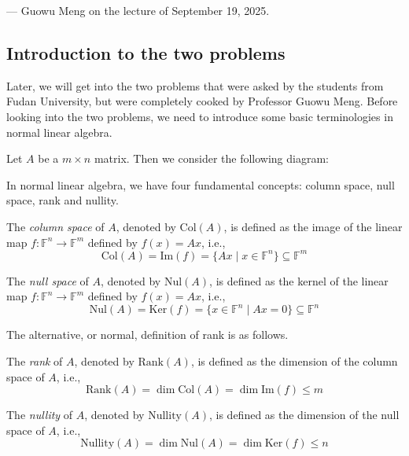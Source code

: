 \documentclass[
	11pt, %
	fleqn, %
	a4paper, %
]{LegrandOrangeBook}
\renewcommand{\ker}[1]{\text{Ker}(#1)} %
\renewcommand{\Im}[1]{\text{Im}(#1)} %
\newcommand{\F}{\mathbb{F}} %
\newcommand{\rank}[1]{\text{Rank}(#1)} %
\newcommand{\nullity}[1]{\text{Nullity}(#1)} %
\newcommand{\nul}[1]{\text{Nul}(#1)} %
\newcommand{\col}[1]{\text{Col}(#1)} %
\begin{document}
\begin{flushright}
    --- Guowu Meng on the lecture of September 19, 2025.
\end{flushright}

\subsection{Introduction to the two problems}

Later, we will get into the two problems that were asked by the students from Fudan University, but were completely cooked by Professor Guowu Meng. Before looking into the two problems, we need to introduce some basic terminologies in normal linear algebra.

Let $A$ be a $m \times n$ matrix. Then we consider the following diagram:
\begin{center}
\end{center}

In normal linear algebra, we have four fundamental concepts: column space, null space, rank and nullity.
\begin{definition}
    The \emph{column space} of $A$, denoted by $\col{A}$, is defined as the image of the linear map $f : \F^n \to \F^m$ defined by $f(x) = Ax$, i.e.,
    \[
        \col{A} = \Im{f} = \{ Ax \mid x \in \F^n \} \subseteq \F^m
    \]
\end{definition}

\newpage

\begin{definition}
    The \emph{null space} of $A$, denoted by $\nul{A}$, is defined as the kernel of the linear map $f : \F^n \to \F^m$ defined by $f(x) = Ax$, i.e.,
    \[
        \nul{A} = \ker{f} = \{ x \in \F^n \mid Ax = 0 \} \subseteq \F^n
    \]
\end{definition}

The alternative, or normal, definition of rank is as follows.
\begin{definition}[Rank]
    The \emph{rank} of $A$, denoted by $\rank{A}$, is defined as the dimension of the column space of $A$, i.e.,
    \[
        \rank{A} = \dim{\col{A}} = \dim{\Im{f}} \leq m
    \]
\end{definition}

\begin{definition}[Nullity]
    The \emph{nullity} of $A$, denoted by $\nullity{A}$, is defined as the dimension of the null space of $A$, i.e.,
    \[
        \nullity{A} = \dim{\nul{A}} = \dim{\ker{f}} \leq n
    \]
\end{definition}
\end{document}
